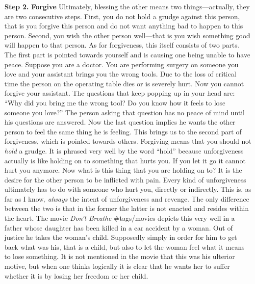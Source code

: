 \textbf{Step 2. Forgive} Ultimately, blessing the other means two
things---actually, they are two consecutive steps. First, you do not
hold a grudge against this person, that is you forgive this person and
do not want anything bad to happen to this person. Second, you wish the
other person well---that is you wish something good will happen to that
person. As for forgiveness, this itself consists of two parts. The first
part is pointed towards yourself and is causing one being unable to have
peace. Suppose you are a doctor. You are performing surgery on someone
you love and your assistant brings you the wrong tools. Due to the loss
of critical time the person on the operating table dies or is severely
hurt. Now you cannot forgive your assistant. The questions that keep
popping up in your head are: ``Why did you bring me the wrong tool? Do
you know how it feels to lose someone you love?'' The person asking that
question has no peace of mind until his questions are answered. Now the
last question implies he wants the other person to feel the same thing
he is feeling. This brings us to the second part of forgiveness, which
is pointed towards others. Forgiving means that you should not
\emph{hold} a grudge. It is phrased very well by the word ``hold''
because unforgiveness actually is like holding on to something that
hurts you. If you let it go it cannot hurt you anymore. Now what is this
thing that you are holding on to? It is the desire for the other person
to be inflicted with pain. Every kind of unforgiveness ultimately has to
do with someone who hurt you, directly or indirectly. This is, as far as
I know, \emph{always} the intent of unforgiveness and revenge. The only
difference between the two is that in the former the latter is not
enacted and resides within the heart. The movie \emph{Don't Breathe}
\#tags/movies depicts this very well in a father whose daughter has been
killed in a car accident by a woman. Out of justice he takes the woman's
child. Supposedly simply in order for him to get back what was his, that
is a child, but also to let the woman feel what it means to lose
something. It is not mentioned in the movie that this was his ulterior
motive, but when one thinks logically it is clear that he wants her to
suffer whether it is by losing her freedom or her child.


